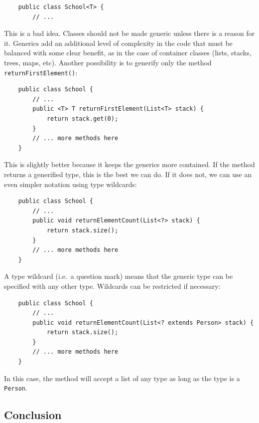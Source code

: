\begin{verbatim}
    public class School<T> {
        // ...
\end{verbatim}

This is a bad idea. Classes should not be made generic unless there is
a reason for it. Generics add an additional level of complexity in the
code that must be balanced with some clear benefit, as in the case of
container classes (lists, stacks, trees, maps, etc). Another
possibility is to generify only the method
\verb+returnFirstElement()+: 

\begin{verbatim}
    public class School {
        // ...
        public <T> T returnFirstElement(List<T> stack) {
            return stack.get(0); 
        }
        // ... more methods here
    }
\end{verbatim}

This is slightly better because it keeps the generics more
contained. If the method returns a generified type, this is the best
we can do. If it does not, we can use an even simpler notation using
type wildcards: 

\begin{verbatim}
    public class School {
        // ...
        public void returnElementCount(List<?> stack) {
            return stack.size();
        }
        // ... more methods here
    }
\end{verbatim}

A type wildcard (i.e.~a question mark) means that the generic
type can be specified with any other type. Wildcards can be restricted
if necessary: 

\begin{verbatim}
    public class School {
        // ...
        public void returnElementCount(List<? extends Person> stack) {
            return stack.size();
        }
        // ... more methods here
    }
\end{verbatim}

In this case, the method will accept a list of any type as long as the
type is a \verb+Person+. 

%
% 
% 


\subsection{Conclusion}
\label{sec:conclusion-2}


